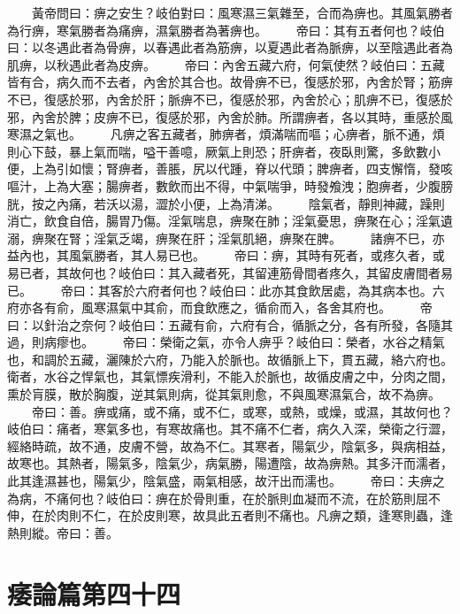 　　黃帝問曰：痹之安生？岐伯對曰：風寒濕三氣雜至，合而為痹也。其風氣勝者為行痹，寒氣勝者為痛痹，濕氣勝者為著痹也。
　　帝曰：其有五者何也？岐伯曰：以冬遇此者為骨痹，以春遇此者為筋痹，以夏遇此者為脈痹，以至陰遇此者為肌痹，以秋遇此者為皮痹。
　　帝曰：內舍五藏六府，何氣使然？岐伯曰：五藏皆有合，病久而不去者，內舍於其合也。故骨痹不已，復感於邪，內舍於腎；筋痹不已，復感於邪，內舍於肝；脈痹不已，復感於邪，內舍於心；肌痹不已，復感於邪，內舍於脾；皮痹不已，復感於邪，內舍於肺。所謂痹者，各以其時，重感於風寒濕之氣也。
　　凡痹之客五藏者，肺痹者，煩滿喘而嘔；心痹者，脈不通，煩則心下鼓，暴上氣而喘，嗌干善噫，厥氣上則恐；肝痹者，夜臥則驚，多飲數小便，上為引如懷；腎痹者，善脹，尻以代踵，脊以代頭；脾痹者，四支懈惰，發咳嘔汁，上為大塞；腸痹者，數飲而出不得，中氣喘爭，時發飧洩；胞痹者，少腹膀胱，按之內痛，若沃以湯，澀於小便，上為清涕。
　　陰氣者，靜則神藏，躁則消亡，飲食自倍，腸胃乃傷。淫氣喘息，痹聚在肺；淫氣憂思，痹聚在心；淫氣遺溺，痹聚在腎；淫氣乏竭，痹聚在肝；淫氣肌絕，痹聚在脾。
　　諸痹不巳，亦益內也，其風氣勝者，其人易已也。
　　帝曰：痹，其時有死者，或疼久者，或易已者，其故何也？岐伯曰：其入藏者死，其留連筋骨間者疼久，其留皮膚間者易已。
　　帝曰：其客於六府者何也？岐伯曰：此亦其食飲居處，為其病本也。六府亦各有俞，風寒濕氣中其俞，而食飲應之，循俞而入，各舍其府也。
　　帝曰：以針治之奈何？岐伯曰：五藏有俞，六府有合，循脈之分，各有所發，各隨其過，則病瘳也。
　　帝曰：榮衛之氣，亦令人痹乎？岐伯曰：榮者，水谷之精氣也，和調於五藏，灑陳於六府，乃能入於脈也。故循脈上下，貫五藏，絡六府也。衛者，水谷之悍氣也，其氣慓疾滑利，不能入於脈也，故循皮膚之中，分肉之間，熏於肓膜，散於胸腹，逆其氣則病，從其氣則愈，不與風寒濕氣合，故不為痹。
　　帝曰：善。痹或痛，或不痛，或不仁，或寒，或熱，或燥，或濕，其故何也？岐伯曰：痛者，寒氣多也，有寒故痛也。其不痛不仁者，病久入深，榮衛之行澀，經絡時疏，故不通，皮膚不營，故為不仁。其寒者，陽氣少，陰氣多，與病相益，故寒也。其熱者，陽氣多，陰氣少，病氣勝，陽遭陰，故為痹熱。其多汗而濡者，此其逢濕甚也，陽氣少，陰氣盛，兩氣相感，故汗出而濡也。
　　帝曰：夫痹之為病，不痛何也？岐伯曰：痹在於骨則重，在於脈則血凝而不流，在於筋則屈不伸，在於肉則不仁，在於皮則寒，故具此五者則不痛也。凡痹之類，逢寒則蟲，逢熱則縱。帝曰：善。


\section{痿論篇第四十四}

